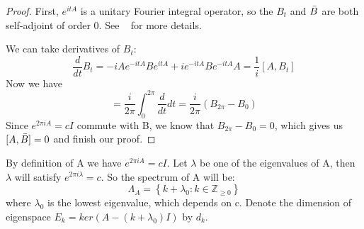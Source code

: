 \documentclass[10pt]{amsart}
\newcommand{\1}{\mathbb{1}}
\newcommand{\Z}{{\mathbb Z}}
\begin{document}
\begin{proof}
    First, $e^{itA} $ is a unitary Fourier integral operator, so the $B_t$ and $\Bar{B}$ are both self-adjoint of order 0. See ~\cite{DuistermaatGuillemin} for more details.
    
    We can take derivatives of $B_t$:
    \begin{equation}\label{commu}
        \frac{d}{dt} B_t = -iAe^{-itA}B e^{itA} + ie^{-itA}Be^{-itA}A = \frac{1}{i}[A,B_t]
    \end{equation}
    Now we have 
    \begin{equation*}
        [A,\Bar{B}] = \frac{i}{2\pi}\int_0^{2\pi} \frac{d}{dt} dt = \frac{i}{2\pi}(B_{2\pi} - B_0)
    \end{equation*}
    Since $e^{2\pi i A} = cI$  commute with B, we know that $B_{2\pi} - B_0 = 0$, which gives us $[A,\Bar{B}] = 0$ and finish our proof.
\end{proof}

By definition of A we have $e^{2\pi i A} = cI$. Let $\lambda$ be one of the eigenvalues of A, then $\lambda$ will satisfy $e^{2\pi i \lambda} = c$. So the spectrum of A will be:
\[
    \Lambda_A = \left\{k+\lambda_0 : k \in \Z_{\geq 0} \right\}
\]
where $\lambda_0$ is the lowest eigenvalue, which depends on c. Denote the dimension of eigenspace $E_k = ker(A - (k+ \lambda_0)I)$ by $d_k$. 
\end{document}
